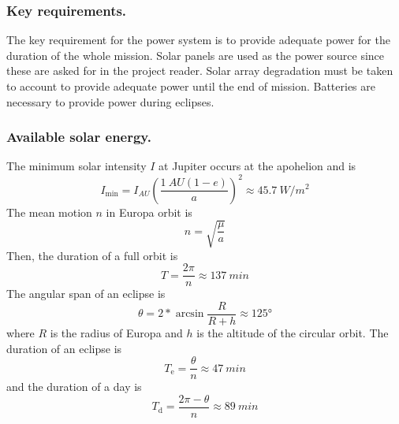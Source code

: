 

\subsubsection{Key requirements.}

The key requirement for the power system is to provide adequate power
for the duration of the whole mission. Solar panels are used as the
power source since these are asked for in the project reader. Solar
array degradation must be taken to account to provide adequate power
until the end of mission. Batteries are necessary to provide power
during eclipses.


\subsubsection{Available solar energy.}

The minimum solar intensity $I$ at Jupiter occurs at the apohelion and is
\begin{equation}
  I_{\mathrm{min}} = I_{\si{AU}} \left(\frac{\SI{1}{AU} (1 - e)}{a}\right)^2
  \approx \SI{45.7}{W/m^2}
\end{equation}
The mean motion $n$ in Europa orbit is
\begin{equation}
  n = \sqrt{\frac{\mu}{a}}
\end{equation}
Then, the duration of a full orbit is
\begin{equation}
  T = \frac{2 \pi}{n} \approx \SI{137}{min}
\end{equation}
The angular span of an eclipse is
\begin{equation}
  \theta = 2 * \arcsin \frac{R}{R + h} \approx \ang{125}
\end{equation}
where $R$ is the radius of Europa and $h$ is the altitude of the
circular orbit. The duration of an eclipse is
\begin{equation}
  T_{\mathrm{e}} = \frac{\theta}{n} \approx \SI{47}{min}
\end{equation}
and the duration of a day is
\begin{equation}
  T_{\mathrm{d}} = \frac{2 \pi - \theta}{n} \approx \SI{89}{min}
\end{equation}

